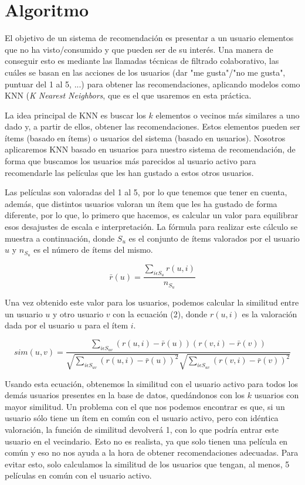 \section{Algoritmo}

El objetivo de un sistema de recomendación es presentar a un usuario elementos que no ha visto/consumido y que pueden ser de su interés. Una manera de conseguir esto es mediante las llamadas técnicas de filtrado colaborativo, las cuáles se basan en las acciones de los usuarios (dar "me gusta"/"no me gusta", puntuar del 1 al 5, ...) para obtener las recomendaciones, aplicando modelos como KNN (\textit{K Nearest Neighbors}, que es el que usaremos en esta práctica.

La idea principal de KNN es buscar los $k$ elementos o vecinos más similares a uno dado y, a partir de ellos, obtener las recomendaciones. Estos elementos pueden ser ítems (basado en ítems) o usuarios del sistema (basado en usuarios). Nosotros aplicaremos KNN basado en usuarios para nuestro sistema de recomendación, de forma que buscamos los usuarios más parecidos al usuario activo para recomendarle las películas que les han gustado a estos otros usuarios.

Las películas son valoradas del 1 al 5, por lo que tenemos que tener en cuenta, además, que distintos usuarios valoran un ítem que les ha gustado de forma diferente, por lo que, lo primero que hacemos, es calcular un valor para equilibrar esos desajustes de escala e interpretación. La fórmula para realizar este cálculo se muestra a continuación, donde $S_u$ es el conjunto de ítems valorados por el usuario $u$ y $n_{S_u}$ es el número de ítems del mismo.

\begin{equation}
    \bar{r}(u) = \frac{\sum_{i \epsilon S_u} r(u, i)}{n_{S_u}}
\end{equation}

Una vez obtenido este valor para los usuarios, podemos calcular la similitud entre un usuario $u$ y otro usuario $v$ con la ecuación (2), donde $r(u,i)$ es la valoración dada por el usuario $u$ para el ítem $i$.

\begin{equation}
    sim(u,v) = \frac{\sum_{i \epsilon S_{uv}}(r(u,i) - \bar{r}(u))(r(v,i) - \bar{r}(v))}{\sqrt{\sum_{i \epsilon S_{uv}}(r(u,i) - \bar{r}(u))^2} \sqrt{\sum_{i \epsilon S_{uv}}(r(v,i) - \bar{r}(v))^2}}
\end{equation}

Usando esta ecuación, obtenemos la similitud con el usuario activo para todos los demás usuarios presentes en la base de datos, quedándonos con los $k$ usuarios con mayor similitud. Un problema con el que nos podemos encontrar es que, si un usuario sólo tiene un ítem en común con el usuario activo, pero con idéntica valoración, la función de similitud devolverá 1, con lo que podría entrar este usuario en el vecindario. Esto no es realista, ya que solo tienen una película en común y eso no nos ayuda a la hora de obtener recomendaciones adecuadas. Para evitar esto, solo calculamos la similitud de los usuarios que tengan, al menos, 5 películas en común con el usuario activo.

